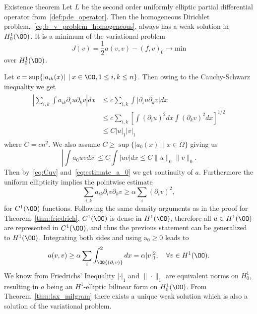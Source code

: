 \begin{thmx}{Existence theorem}
    Let $L$ be the second order uniformly elliptic partial differential operator from~\eqref{def:pde_operator}.
     Then the homogeneous Dirichlet problem,~\eqref{eq:b_v_problem_homogeneous}, always has a weak solution in $H_0^1(\OO)$. It is a minimum of the variational problem
    \begin{equation}
        J(v)=\frac{1}{2} a(v,v) - {(f, v)}_0 \rightarrow \text{min}
    \end{equation}
    over $H_0^1(\OO)$.\label{thm:existence_hom_dirichlet}
\end{thmx}

\begin{bev}
    Let $c = \sup\{\left| a_{ik}(x) \right| \; | \; x \in \OO, 1 \leq i,k \leq n\}$. Then owing to the Cauchy-Schwarz inequality we get
    \begin{align}
    \begin{split}
        \left| \sum_{i,k} \int a_{ik} \partial_i u \partial_k v  \right| dx &\leq c \sum_{i,k} \int  \left|  \partial_i u \partial_k v \right|dx\\
        &\leq c \sum_{i,k} {\left[ \int {\left( \partial_i u \right)}^2 dx \int {\left( \partial_k v \right)}^2 dx  \right]}^{1/2} \\
        &\leq C {\left| u \right|}_1 {\left| v \right|}_1 \label{eq:Cuv}
    \end{split}
    \end{align}
    where $C=cn^2$. 
    We also assume $C\geq \sup\{|a_0(x)| \; | \; x\in \Omega\}$ giving us
    \begin{equation}
        \left|\int a_0 u v dx \right| \leq C \int |u v| dx \leq C \|u\|_0 \|v\|_0.  
        \label{eq:estimate_a_0}   
    \end{equation}
    Then by~\eqref{eq:Cuv} and~\eqref{eq:estimate_a_0} we get continuity of $a$.
    Furthermore the uniform ellipticity implies the pointwise estimate %
    \[
        \sum_{i,k} a_{ik} \partial_i v \partial_k v \geq \alpha \sum_i {\left( \partial_i v \right)}^2,
    \]
    for $C^1(\OO)$ functions.
    Following the same density arguments as in the proof for Theorem~\ref{thm:friedrich}, $C^1(\OO)$ is dense in $H^1(\OO)$, therefore all $u \in H^1(\OO)$ are represented in $C^1(\OO)$, and thus the previous statement can be generalized to $H^1(\OO)$.
    Integrating both sides and using $\text{a}_0 \geq 0$ leads to %
    \begin{equation}
        a(v,v) \geq \alpha \sum_i \int_\OO {\left(\partial_i v\right)}^2 dx = \alpha |v|^2_1, \quad \forall v \in H^1(\OO).
        \label{eq:alpha_ellipticity}
    \end{equation}
    We know from Friedrichs' Inequality $|\cdot|_1$ and $\| \cdot \|_1$ are equivalent norms on $H_0^1$,
     resulting in $a$ being an $H^1$-elliptic bilinear form on $H_0^1(\OO)$.
    From Theorem~\ref{thm:lax_milgram} there exists a unique weak solution which is also a solution of the variational problem.
\end{bev}